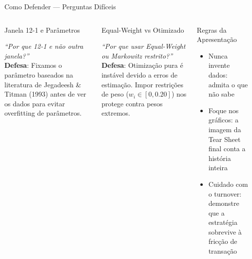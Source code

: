 \documentclass[aspectratio=169,12pt]{beamer}
\begin{document}
\begin{frame}[fragile]{Como Defender — Perguntas Difíceis}
\begin{columns}[T]
\begin{block}{Janela 12-1 e Parâmetros}

\textit{``Por que 12-1 e não outra janela?''}\\[.3em]
\textbf{Defesa}: Fixamos o parâmetro baseados na literatura de Jegadeesh \& Titman (1993) antes de ver os dados para evitar overfitting de parâmetros.

\end{block}
\vspace{.2em}
\begin{block}{Equal-Weight vs Otimizado}

\textit{``Por que usar Equal-Weight ou Markowitz restrito?''}\\[.3em]
\textbf{Defesa}: Otimização pura é instável devido a erros de estimação. Impor restrições de peso ($w_i \in [0, 0.20]$) nos protege contra pesos extremos.

\end{block}
\begin{block}{Regras da Apresentação}
\begin{itemize}
  \item Nunca invente dados: admita o que não sabe
  \item Foque nos gráficos: a imagem da Tear Sheet final conta a história inteira
  \item Cuidado com o turnover: demonstre que a estratégia sobrevive à fricção de transação
\end{itemize}
\end{block}
\end{columns}
\end{frame}
\end{document}
